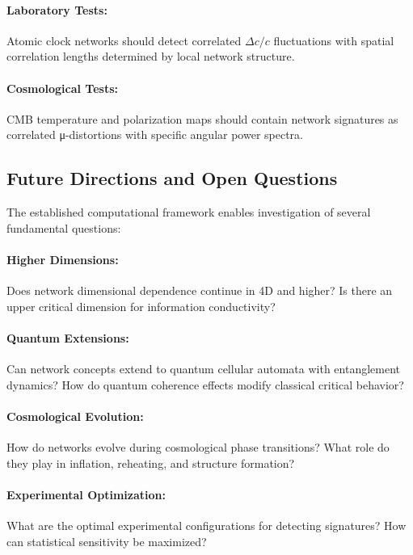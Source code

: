 \paragraph{Laboratory Tests:}
Atomic clock networks should detect correlated $\Delta c/c$ fluctuations with 
spatial correlation lengths determined by local \saturon{} network structure.

\paragraph{Cosmological Tests:}
CMB temperature and polarization maps should contain \saturon{} network 
signatures as correlated μ-distortions with specific angular power spectra.

\subsection{Future Directions and Open Questions}

The established computational framework enables investigation of several 
fundamental questions:

\paragraph{Higher Dimensions:}
Does \saturon{} network dimensional dependence continue in 4D and higher? 
Is there an upper critical dimension for information conductivity?

\paragraph{Quantum Extensions:}
Can \saturon{} network concepts extend to quantum cellular automata with 
entanglement dynamics? How do quantum coherence effects modify classical 
critical behavior?

\paragraph{Cosmological Evolution:}
How do \saturon{} networks evolve during cosmological phase transitions? 
What role do they play in inflation, reheating, and structure formation?

\paragraph{Experimental Optimization:}
What are the optimal experimental configurations for detecting \saturon{} 
signatures? How can statistical sensitivity be maximized?

